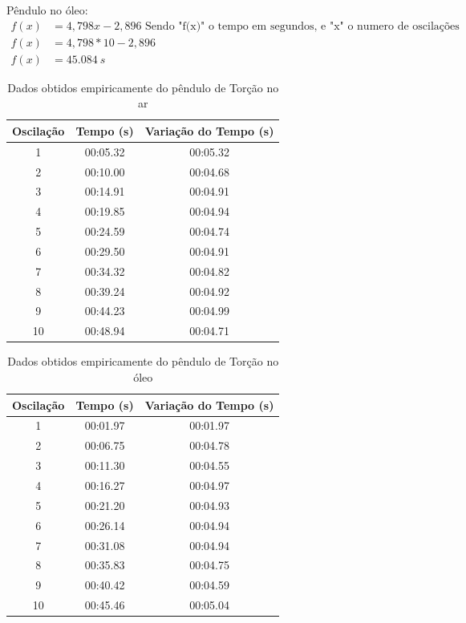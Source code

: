 Pêndulo no óleo:
\begin{align*}
	f(x) &= 4,798x -  2,896 \text{ Sendo "f(x)" o tempo em segundos, e "x" o numero de oscilações}\\
	f(x) &= 4,798 * 10 - 2,896\\
	f(x) &= \qty{45,084}{s}
\end{align*}

\begin{table}[H]
	\caption{Dados obtidos empiricamente do pêndulo de Torção no ar} \label{tabelaar}
	\begin{center}
		\begin{tabular}{c c c}
			\hline
			Oscilação & Tempo (s) & Variação do Tempo (s) \\
			\hline
			1 & 00:05.32 & 00:05.32\\
			2 & 00:10.00 & 00:04.68\\
			3 & 00:14.91 & 00:04.91\\
			4 & 00:19.85 & 00:04.94\\
			5 & 00:24.59 & 00:04.74\\
			6 & 00:29.50 & 00:04.91\\
			7 & 00:34.32 & 00:04.82\\
			8 & 00:39.24 & 00:04.92\\
			9 & 00:44.23 & 00:04.99\\
			10 & 00:48.94 & 00:04.71\\
			\hline
		\end{tabular}
	\end{center}
\end{table}

\begin{table}[H]
	\caption{Dados obtidos empiricamente do pêndulo de Torção no óleo} \label{tabelaóleo}
	\begin{center}
		\begin{tabular}{c c c}
			\hline
			Oscilação & Tempo (s) & Variação do Tempo (s) \\
			\hline
			1 & 00:01.97 & 00:01.97\\
			2 & 00:06.75 & 00:04.78\\
			3 & 00:11.30 & 00:04.55\\
			4 & 00:16.27 & 00:04.97\\
			5 & 00:21.20 & 00:04.93\\
			6 & 00:26.14 & 00:04.94\\
			7 & 00:31.08 & 00:04.94\\
			8 & 00:35.83 & 00:04.75\\
			9 & 00:40.42 & 00:04.59\\
			10 & 00:45.46 & 00:05.04\\
			\hline
		\end{tabular}
	\end{center}
\end{table}

